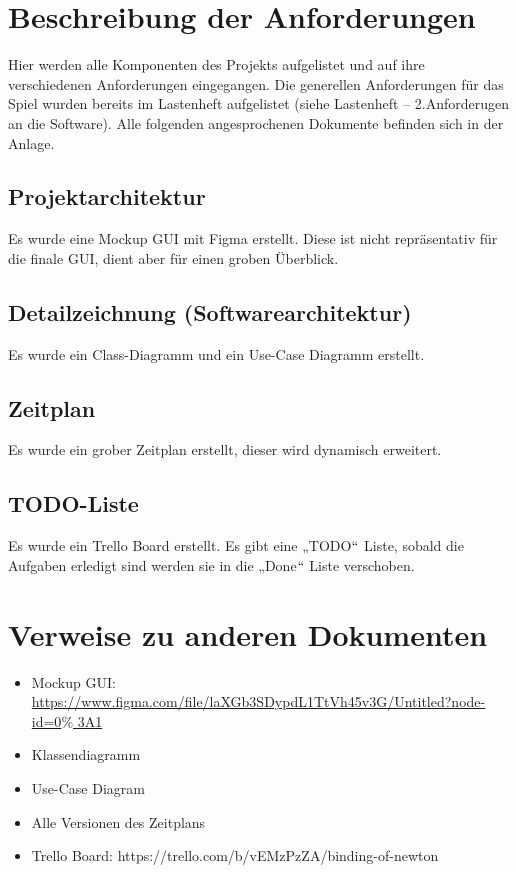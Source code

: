 \documentclass[12pt]{article}
\renewcommand{\_}{\kern-1.5pt\textunderscore\kern-1.5pt}
\begin{document}
\vspace{\baselineskip}
\section*{Beschreibung der Anforderungen}
Hier werden alle Komponenten des Projekts aufgelistet und auf ihre verschiedenen Anforderungen eingegangen. Die generellen Anforderungen für das Spiel wurden bereits im Lastenheft aufgelistet (siehe Lastenheft – 2.Anforderugen an die Software). Alle folgenden angesprochenen Dokumente befinden sich in der Anlage.
\subsection*{Projektarchitektur}
Es wurde eine Mockup GUI mit Figma erstellt. Diese ist nicht repräsentativ für die finale GUI, dient aber für einen groben Überblick.
\subsection*{Detailzeichnung (Softwarearchitektur)}
Es wurde ein Class-Diagramm und ein Use-Case Diagramm erstellt.
\subsection*{Zeitplan}
Es wurde ein grober Zeitplan erstellt, dieser wird dynamisch erweitert. 
\subsection*{TODO-Liste }
Es wurde ein Trello Board erstellt. Es gibt eine „TODO$``$ Liste, sobald die Aufgaben erledigt sind werden sie in die „Done$``$ Liste verschoben.

\vspace{\baselineskip}
\section*{Verweise zu anderen Dokumenten}
\begin{itemize}
	\item Mockup GUI: \\
\href{https://www.figma.com/file/laXGb3SDypdL1TtVh45v3G/Untitled?node-id=0\%3A1}{https://www.figma.com/file/laXGb3SDypdL1TtVh45v3G/Untitled?node-id=0$\%$ 3A1}
	\item Klassendiagramm 
	\item Use-Case Diagram
	\item Alle Versionen des Zeitplans
	\item Trello Board: https://trello.com/b/vEMzPzZA/binding-of-newton
\end{itemize}

\vspace{\baselineskip}
\printbibliography
\end{document}

